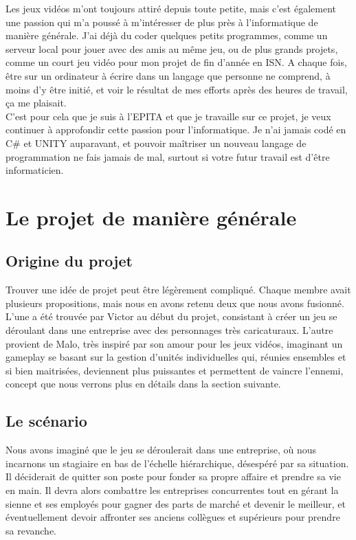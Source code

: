 \documentclass{article}
\begin{document}
Les jeux vidéos m'ont toujours attiré depuis toute petite, mais c'est également une passion qui m'a poussé à m'intéresser de plus près à l'informatique de manière générale. J'ai déjà du coder quelques petits programmes, comme un serveur local pour jouer avec des amis au même jeu, ou de plus grands projets, comme un court jeu vidéo pour mon projet de fin d'année en ISN. A chaque fois, être sur un ordinateur à écrire dans un langage que personne ne comprend, à moins d'y être initié, et voir le résultat de mes efforts après des heures de travail, ça me plaisait. \\

C'est pour cela que je suis à l'EPITA et que je travaille sur ce projet, je veux continuer à approfondir cette passion pour l'informatique. Je n'ai jamais codé en C\# et UNITY auparavant, et pouvoir maîtriser un nouveau langage de programmation ne fais jamais de mal, surtout si votre futur travail est d'être informaticien.

\section{Le projet de manière générale}
\subsection{Origine du projet}
Trouver une idée de projet peut être légèrement compliqué. Chaque membre avait plusieurs propositions, mais nous en avons retenu deux que nous avons fusionné. L'une a été trouvée par Victor au début du projet, consistant à créer un jeu se déroulant dans une entreprise avec des personnages très caricaturaux. L'autre provient de Malo, très inspiré par son amour pour les jeux vidéos, imaginant un gameplay se basant sur la gestion d'unités individuelles qui, réunies ensembles et si bien maitrisées, deviennent plus puissantes et permettent de vaincre l'ennemi, concept que nous verrons plus en détails dans la section suivante.

\subsection{Le scénario}
Nous avons imaginé que le jeu se déroulerait dans une entreprise, où nous incarnons un stagiaire en bas de l'échelle hiérarchique, désespéré par sa situation. Il déciderait de quitter son poste pour fonder sa propre affaire et prendre sa vie en main. Il devra alors combattre les entreprises concurrentes tout en gérant la sienne et ses employés pour gagner des parts de marché et devenir le meilleur, et éventuellement devoir affronter ses anciens collègues et supérieurs pour prendre sa revanche.
\end{document}
